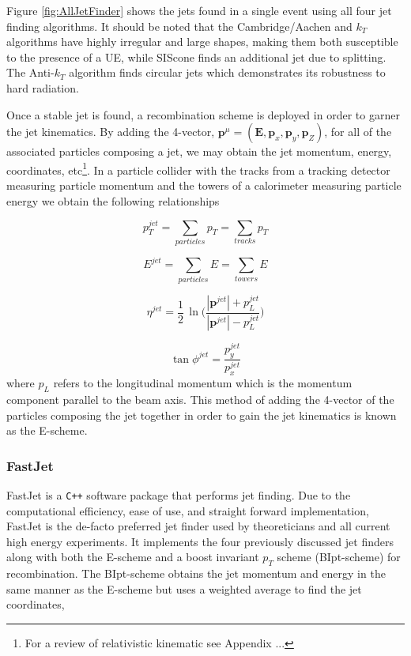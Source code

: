 Figure \ref{fig:AllJetFinder} shows the jets found in a single event using all four jet finding algorithms.  It should be noted that the Cambridge/Aachen and $k_{T}$ algorithms have highly irregular and large shapes, making them both susceptible to the presence of a UE, while SIScone finds an additional jet due to splitting.  The Anti-$k_{T}$ algorithm finds circular jets which demonstrates its robustness to hard radiation.  

Once a stable jet is found, a recombination scheme is deployed in order to garner the jet kinematics.  By adding the 4-vector, $\boldsymbol{p}^{\mu} = (\boldsymbol{E},\boldsymbol{p}_{x},\boldsymbol{p}_{y},\boldsymbol{p}_{Z})$, for all of the associated particles composing a jet, we may obtain the jet momentum, energy, coordinates, etc\footnote{For a review of relativistic kinematic see Appendix ...}.  In a particle collider with the tracks from a tracking detector measuring particle momentum and the towers of a calorimeter measuring particle energy we obtain the following relationships



\begin{equation}
p_{T}^{jet} = \sum_{particles} p_{T} = \sum_{tracks} p_{T}
\label{eq:JePt}
\end{equation}

\begin{equation}
E^{jet} = \sum_{particles} E = \sum_{towers} E
\label{eq:JetE}
\end{equation}

\begin{equation}
\eta^{jet} = \frac{1}{2} \, \ln \Bigg (  \frac{|\boldsymbol{p}^{jet}| + p_{L}^{jet}}{|\boldsymbol{p}^{jet}| - p_{L}^{jet}}  \Bigg )
\label{eq:JetEta}
\end{equation}

\begin{equation}
\tan \phi^{jet} = \frac{p_{y}^{jet}}{p_{x}^{jet}}
\label{eq:JetPhi}
\end{equation}
\noindent 
where $p_{L}$ refers to the longitudinal momentum which is the momentum component parallel to the beam axis.  This method of adding the 4-vector of the particles composing the jet together in order to gain the jet kinematics is known as the E-scheme\cite{Cacciari:2011ma}.

\subsubsection{FastJet}
FastJet\cite{Cacciari:2011ma} is a \verb|C++| software package that performs jet finding.  Due to the computational efficiency, ease of use, and straight forward implementation, FastJet is the de-facto preferred jet finder used by theoreticians and all current high energy experiments. It implements the four previously discussed jet finders along with both the E-scheme and a boost invariant $p_{T}$ scheme (BIpt-scheme) for recombination.  The BIpt-scheme obtains the jet momentum and energy in the same manner as the E-scheme but uses a weighted average to find the jet coordinates,

